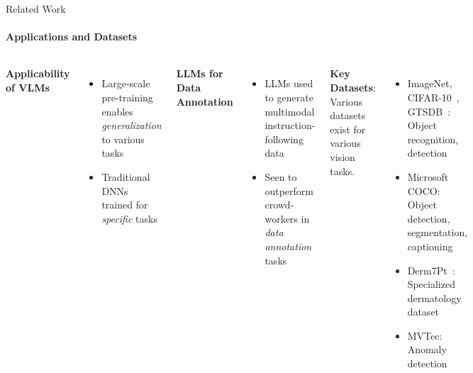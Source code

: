 \begin{frame}{Related Work}
\framesubtitle{Applications and Datasets}
  \vspace{-1.4em}
  \begin{columns}[T]
    \column{\customcolumnwidth}
      \textbf{Applicability of VLMs}
      \vspace{-0.2em}
      \begin{itemize}
        \item Large-scale pre-training enables \emph{generalization} to various tasks
        \item Traditional DNNs trained for \emph{specific} tasks
      \end{itemize}
      \textbf{LLMs for Data Annotation}
      \vspace{-0.4em}
      \begin{itemize}
        \item LLMs used to generate multimodal instruction-following data~
        \item Seen to outperform crowd-workers in \emph{data annotation} tasks~
      \end{itemize}
    \column{\customcolumnwidth}
    \textbf{Key Datasets}:
    Various datasets exist for various vision tasks.
    \vspace{-0.2em}
    \begin{itemize}
      \setlength{\itemsep}{0em}
      \item ImageNet, CIFAR-10~, GTSDB~: Object recognition, detection
      \item Microsoft COCO: Object detection, segmentation, captioning
      \item Derm7Pt~: Specialized dermatology dataset
      \item MVTec: Anomaly detection
    \end{itemize}
  \end{columns}
\end{frame}
